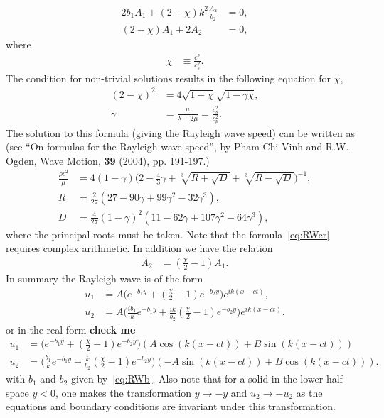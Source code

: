 \begin{align}
   2 b_1 A_1 + ( 2 - \chi) k^2 \frac{A_2}{b_2} &= 0,\\
   (2-\chi) A_1 + 2 A_2 &= 0, 
\end{align} 
where
\begin{align}
   \chi& \equiv \frac{c^2}{c_s^2}. 
\end{align} 
The condition for non-trivial solutions results in the following equation for $\chi$, 
\begin{align}
  (2-\chi)^2 &= 4\sqrt{1-\chi}\sqrt{1-\gamma \chi}, \\
  \gamma &= \frac{\mu}{\lambda+2\mu} = \frac{c_s^2}{c_p^2}.
\end{align}
The solution to this formula (giving the Rayleigh wave speed) can be written as (see 
``On formulas for the Rayleigh wave speed'', by Pham Chi Vinh and R.W. Ogden, Wave Motion, {\bf 39} (2004), pp. 191-197.)
\begin{align}
  \frac{\rho c^2}{\mu} &= 4(1-\gamma)\big( 2 - \frac{4}{3}\gamma + \sqrt[3]{ R + \sqrt{D}} + \sqrt[3]{ R-\sqrt{D}} \Big)^{-1}, \label{eq:RWcr} \\
  R &= \frac{2}{27} (27 - 90\gamma + 99\gamma^2 -32\gamma^3 ), \\
  D &= \frac{4}{27}(1 -\gamma)^2 (11 - 62\gamma + 107\gamma^2 -64\gamma^3 ),
\end{align} 
where the principal roots must be taken. Note that the formula~\eqref{eq:RWcr} requires complex arithmetic. 
In addition we have the relation
\begin{align}
   A_2 &= (\frac{\chi}{2}-1) A_1 . 
\end{align} 
In summary the Rayleigh wave is of the form 
\begin{align}
 u_1 &= A \Big( e^{-b_1 y } + (\frac{\chi}{2}-1) e^{-b_2 y } \Big) e^{ik(x-ct)},  \\
 u_2 &= A\Big( \frac{i b_1}{k} e^{-b_1 y } + \frac{i k}{b_2} (\frac{\chi}{2}-1) e^{-b_2 y } \Big) e^{ik(x-ct)}.
\end{align} 
or in the real form {\bf check me}
\begin{align}
 u_1 &=  \Big( e^{-b_1 y } + (\frac{\chi}{2}-1) e^{-b_2 y } \Big) (A\cos(k(x-ct)) +B\sin(k(x-ct)) ) \\
 u_2 &=  \Big( \frac{b_1}{k} e^{-b_1 y } + \frac{k}{b_2} (\frac{\chi}{2}-1) e^{-b_2 y } \Big) (-A\sin(k(x-ct)) +B \cos(k(x-ct)) ) .
\end{align} 
with $b_1$ and $b_2$ given by~\eqref{eq:RWb}. Also note that for a solid in the lower half space $y<0$, 
one makes the transformation $y\rightarrow -y$ and $u_2 \rightarrow -u_2$ as the equations and 
boundary conditions are invariant under this transformation.

